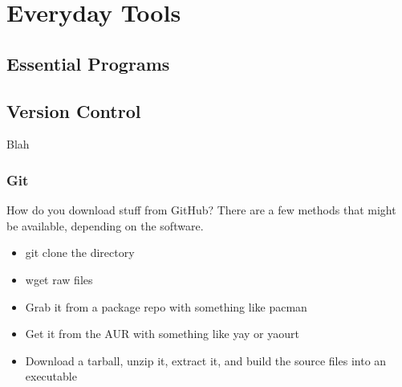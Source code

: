\toclineskip
\section{Everyday Tools}


\subsection{Essential Programs}








\subsection{Version Control}

Blah

\subsubsection{Git}

How do you download stuff from GitHub? There are a few methods that might be available, depending on the software.
\begin{itemize}
	\item git clone the directory
	\item wget raw files
	\item Grab it from a package repo with something like pacman
	\item Get it from the AUR with something like yay or yaourt
	\item Download a tarball, unzip it, extract it, and build the source files into an executable
\end{itemize}

